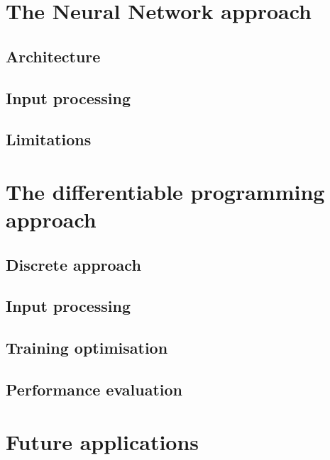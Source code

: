 
\section{The Neural Network approach}
\label{sec:The Neural Network approach}
\subsection{Architecture}
\subsection{Input processing}
\subsection{Limitations}

\section{The differentiable programming approach}
\subsection{Discrete approach}
\subsection{Input processing}
\subsection{Training optimisation}
\subsection{Performance evaluation}

\section{Future applications}